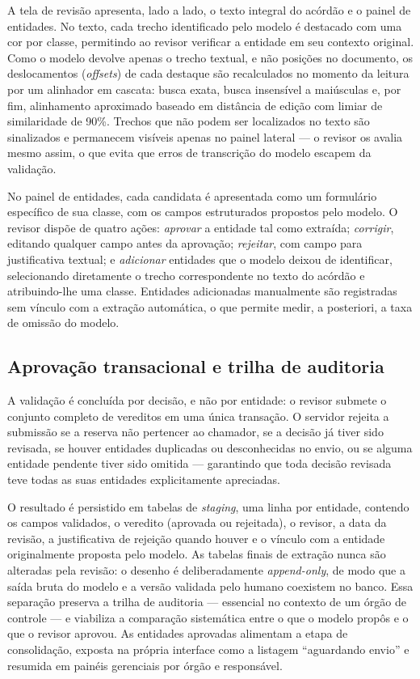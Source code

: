 A tela de revisão apresenta, lado a lado, o texto integral do acórdão e o
painel de entidades. No texto, cada trecho identificado pelo modelo é
destacado com uma cor por classe, permitindo ao revisor verificar a entidade
em seu contexto original. Como o modelo devolve apenas o trecho textual, e
não posições no documento, os deslocamentos (\emph{offsets}) de cada destaque
são recalculados no momento da leitura por um alinhador em cascata: busca
exata, busca insensível a maiúsculas e, por fim, alinhamento aproximado
baseado em distância de edição \cite{levenshtein1966} com limiar de
similaridade de 90\%. Trechos que não podem ser localizados no texto são
sinalizados e permanecem visíveis apenas no painel lateral --- o revisor os
avalia mesmo assim, o que evita que erros de transcrição do modelo escapem da
validação.

No painel de entidades, cada candidata é apresentada como um formulário
específico de sua classe, com os campos estruturados propostos pelo modelo. O
revisor dispõe de quatro ações: \emph{aprovar} a entidade tal como extraída;
\emph{corrigir}, editando qualquer campo antes da aprovação;
\emph{rejeitar}, com campo para justificativa textual;
e \emph{adicionar} entidades que o modelo deixou de identificar, selecionando
diretamente o trecho correspondente no texto do acórdão e atribuindo-lhe uma
classe. Entidades adicionadas manualmente são registradas sem vínculo com a
extração automática, o que permite medir, a posteriori, a taxa de omissão do
modelo.

\subsection{Aprovação transacional e trilha de auditoria}
\label{subsec:validacao-aprovacao}

A validação é concluída por decisão, e não por entidade: o revisor submete o
conjunto completo de vereditos em uma única transação. O servidor rejeita a
submissão se a reserva não pertencer ao chamador, se a decisão já tiver sido
revisada, se houver entidades duplicadas ou desconhecidas no envio, ou se
alguma entidade pendente tiver sido omitida --- garantindo que toda decisão
revisada teve todas as suas entidades explicitamente apreciadas.

O resultado é persistido em tabelas de \emph{staging}, uma linha por entidade,
contendo os campos validados, o veredito (aprovada ou rejeitada), o revisor, a
data da revisão, a justificativa de rejeição quando houver e o vínculo com a
entidade originalmente proposta pelo modelo. As tabelas finais de extração
nunca são alteradas pela revisão: o desenho é deliberadamente
\emph{append-only}, de modo que a saída bruta do modelo e a versão validada
pelo humano coexistem no banco. Essa separação preserva a trilha de auditoria
--- essencial no contexto de um órgão de controle --- e viabiliza a comparação
sistemática entre o que o modelo propôs e o que o revisor aprovou. As
entidades aprovadas alimentam a etapa de consolidação, exposta na própria
interface como a listagem ``aguardando envio'' e resumida em painéis
gerenciais por órgão e responsável.

